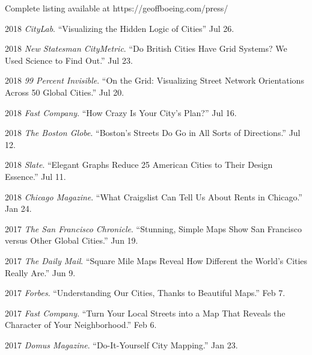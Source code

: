 \documentclass[12pt,letterpaper]{report}
\begin{document}
\begin{tablist}
	Complete listing available at https://geoffboeing.com/press/ \bigskip
	
	\begin{tablist}
		
		\item 2018 \tab \textit{CityLab}. \enquote{Visualizing the Hidden Logic of Cities} Jul 26.
		
		\item 2018 \tab \textit{New Statesman CityMetric}. \enquote{Do British Cities Have Grid Systems? We Used Science to Find Out.} Jul 23.
		
		\item 2018 \tab \textit{99 Percent Invisible}. \enquote{On the Grid: Visualizing Street Network Orientations Across 50 Global Cities.} Jul 20.
		
		\item 2018 \tab \textit{Fast Company}. \enquote{How Crazy Is Your City's Plan?} Jul 16.
		
		\item 2018 \tab \textit{The Boston Globe}. \enquote{Boston's Streets Do Go in All Sorts of Directions.} Jul 12.
		
		\item 2018 \tab \textit{Slate}. \enquote{Elegant Graphs Reduce 25 American Cities to Their Design Essence.} Jul 11.	
		
		\item 2018 \tab \textit{Chicago Magazine}. \enquote{What Craigslist Can Tell Us About Rents in Chicago.} Jan 24.
		
		\item 2017 \tab \textit{The San Francisco Chronicle}. \enquote{Stunning, Simple Maps Show San Francisco versus Other Global Cities.} Jun 19.
		
		\item 2017 \tab \textit{The Daily Mail}. \enquote{Square Mile Maps Reveal How Different the World's Cities Really Are.} Jun 9.
		
		\item 2017 \tab \textit{Forbes}. \enquote{Understanding Our Cities, Thanks to Beautiful Maps.} Feb 7.
		
		\item 2017 \tab \textit{Fast Company}. \enquote{Turn Your Local Streets into a Map That Reveals the Character of Your Neighborhood.} Feb 6.
		
		\item 2017 \tab \textit{Domus Magazine}. \enquote{Do-It-Yourself City Mapping.} Jan 23.
		

\end{tablist}
\end{tablist}
\end{document}
